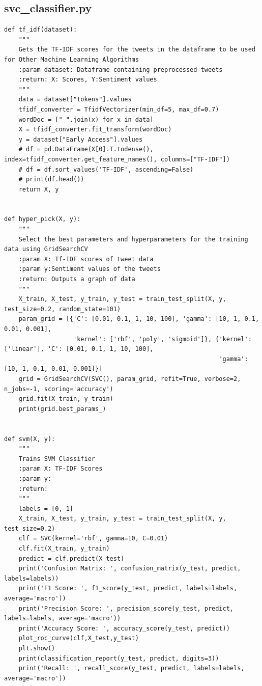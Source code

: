 \documentclass[11pt]{article} %
\begin{document}
\subsection{svc\_classifier.py}
\begin{verbatim}
def tf_idf(dataset):
    """
    Gets the TF-IDF scores for the tweets in the dataframe to be used for Other Machine Learning Algorithms
    :param dataset: Dataframe containing preprocessed tweets
    :return: X: Scores, Y:Sentiment values
    """
    data = dataset["tokens"].values
    tfidf_converter = TfidfVectorizer(min_df=5, max_df=0.7)
    wordDoc = [" ".join(x) for x in data]
    X = tfidf_converter.fit_transform(wordDoc)
    y = dataset["Early Access"].values
    # df = pd.DataFrame(X[0].T.todense(), index=tfidf_converter.get_feature_names(), columns=["TF-IDF"])
    # df = df.sort_values('TF-IDF', ascending=False)
    # print(df.head())
    return X, y


def hyper_pick(X, y):
    """
    Select the best parameters and hyperparameters for the training data using GridSearchCV
    :param X: Tf-IDF scores of tweet data
    :param y:Sentiment values of the tweets
    :return: Outputs a graph of data
    """
    X_train, X_test, y_train, y_test = train_test_split(X, y, test_size=0.2, random_state=101)
    param_grid = [{'C': [0.01, 0.1, 1, 10, 100], 'gamma': [10, 1, 0.1, 0.01, 0.001],
                   'kernel': ['rbf', 'poly', 'sigmoid']}, {'kernel': ['linear'], 'C': [0.01, 0.1, 1, 10, 100],
                                                           'gamma': [10, 1, 0.1, 0.01, 0.001]}]
    grid = GridSearchCV(SVC(), param_grid, refit=True, verbose=2, n_jobs=-1, scoring='accuracy')
    grid.fit(X_train, y_train)
    print(grid.best_params_)


def svm(X, y):
    """
    Trains SVM Classifier
    :param X: TF-IDF Scores
    :param y:
    :return:
    """
    labels = [0, 1]
    X_train, X_test, y_train, y_test = train_test_split(X, y, test_size=0.2)
    clf = SVC(kernel='rbf', gamma=10, C=0.01)
    clf.fit(X_train, y_train)
    predict = clf.predict(X_test)
    print('Confusion Matrix: ', confusion_matrix(y_test, predict, labels=labels))
    print('F1 Score: ', f1_score(y_test, predict, labels=labels, average='macro'))
    print('Precision Score: ', precision_score(y_test, predict, labels=labels, average='macro'))
    print('Accuracy Score: ', accuracy_score(y_test, predict))
    plot_roc_curve(clf,X_test,y_test)
    plt.show()
    print(classification_report(y_test, predict, digits=3))
    print('Recall: ', recall_score(y_test, predict, labels=labels, average='macro'))




\end{verbatim}
\end{document}
